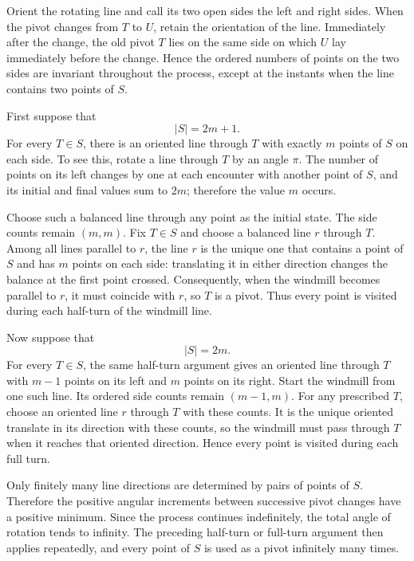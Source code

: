     \begin{solution}
        Orient the rotating line and call its two open sides the left and right
        sides. When the pivot changes from $T$ to $U$, retain the orientation of
        the line. Immediately after the change, the old pivot $T$ lies on the
        same side on which $U$ lay immediately before the change. Hence the
        ordered numbers of points on the two sides are invariant throughout the
        process, except at the instants when the line contains two points of
        $S$.

        First suppose that
        \[
            |S|=2m+1.
        \]
        For every $T\in S$, there is an oriented line through $T$ with exactly
        $m$ points of $S$ on each side. To see this, rotate a line through $T$
        by an angle $\pi$. The number of points on its left changes by one at
        each encounter with another point of $S$, and its initial and final
        values sum to $2m$; therefore the value $m$ occurs.

        Choose such a balanced line through any point as the initial state. The
        side counts remain $(m,m)$. Fix $T\in S$ and choose a balanced line
        $r$ through $T$. Among all lines parallel to $r$, the line $r$ is the
        unique one that contains a point of $S$ and has $m$ points on each
        side: translating it in either direction changes the balance at the
        first point crossed. Consequently, when the windmill becomes parallel
        to $r$, it must coincide with $r$, so $T$ is a pivot. Thus every point
        is visited during each half-turn of the windmill line.

        Now suppose that
        \[
            |S|=2m.
        \]
        For every $T\in S$, the same half-turn argument gives an oriented line
        through $T$ with $m-1$ points on its left and $m$ points on its right.
        Start the windmill from one such line. Its ordered side counts remain
        $(m-1,m)$. For any prescribed $T$, choose an oriented line $r$ through
        $T$ with these counts. It is the unique oriented translate in its
        direction with these counts, so the windmill must pass through $T$ when
        it reaches that oriented direction. Hence every point is visited during
        each full turn.

        Only finitely many line directions are determined by pairs of points of
        $S$. Therefore the positive angular increments between successive pivot
        changes have a positive minimum. Since the process continues
        indefinitely, the total angle of rotation tends to infinity. The
        preceding half-turn or full-turn argument then applies repeatedly, and
        every point of $S$ is used as a pivot infinitely many times.
    \end{solution}

